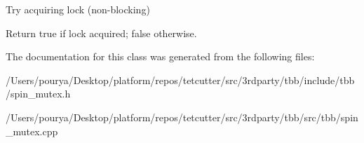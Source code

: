 Try acquiring lock (non-\/blocking) 

Return true if lock acquired; false otherwise. 

The documentation for this class was generated from the following files\+:\begin{DoxyCompactItemize}
\item 
/\+Users/pourya/\+Desktop/platform/repos/tetcutter/src/3rdparty/tbb/include/tbb/spin\+\_\+mutex.\+h\item 
/\+Users/pourya/\+Desktop/platform/repos/tetcutter/src/3rdparty/tbb/src/tbb/spin\+\_\+mutex.\+cpp\end{DoxyCompactItemize}
